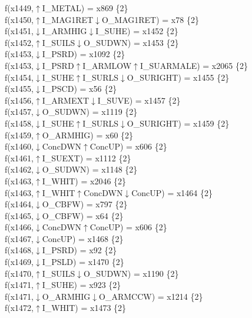f(x1449,$\uparrow$I\_METAL) = x869 \{2\} \\  
f(x1450,$\uparrow$I\_MAG1RET$\downarrow$O\_MAG1RET) = x78 \{2\} \\  
f(x1451,$\downarrow$I\_ARMHIG$\downarrow$I\_SUHE) = x1452 \{2\} \\  
f(x1452,$\uparrow$I\_SUILS$\downarrow$O\_SUDWN) = x1453 \{2\} \\  
f(x1453,$\downarrow$I\_PSRD) = x1092 \{2\} \\  
f(x1453,$\downarrow$I\_PSRD$\uparrow$I\_ARMLOW$\uparrow$I\_SUARMALE) = x2065 \{2\} \\  
f(x1454,$\downarrow$I\_SUHE$\uparrow$I\_SURLS$\downarrow$O\_SURIGHT) = x1455 \{2\} \\  
f(x1455,$\downarrow$I\_PSCD) = x56 \{2\} \\  
f(x1456,$\uparrow$I\_ARMEXT$\downarrow$I\_SUVE) = x1457 \{2\} \\  
f(x1457,$\downarrow$O\_SUDWN) = x1119 \{2\} \\  
f(x1458,$\downarrow$I\_SUHE$\uparrow$I\_SURLS$\downarrow$O\_SURIGHT) = x1459 \{2\} \\  
f(x1459,$\uparrow$O\_ARMHIG) = x60 \{2\} \\  
f(x1460,$\downarrow$ConcDWN$\uparrow$ConcUP) = x606 \{2\} \\  
f(x1461,$\uparrow$I\_SUEXT) = x1112 \{2\} \\  
f(x1462,$\downarrow$O\_SUDWN) = x1148 \{2\} \\  
f(x1463,$\uparrow$I\_WHIT) = x2046 \{2\} \\  
f(x1463,$\uparrow$I\_WHIT$\uparrow$ConcDWN$\downarrow$ConcUP) = x1464 \{2\} \\  
f(x1464,$\downarrow$O\_CBFW) = x797 \{2\} \\  
f(x1465,$\downarrow$O\_CBFW) = x64 \{2\} \\  
f(x1466,$\downarrow$ConcDWN$\uparrow$ConcUP) = x606 \{2\} \\  
f(x1467,$\downarrow$ConcUP) = x1468 \{2\} \\  
f(x1468,$\downarrow$I\_PSRD) = x92 \{2\} \\  
f(x1469,$\downarrow$I\_PSLD) = x1470 \{2\} \\  
f(x1470,$\uparrow$I\_SUILS$\downarrow$O\_SUDWN) = x1190 \{2\} \\  
f(x1471,$\uparrow$I\_SUHE) = x923 \{2\} \\  
f(x1471,$\downarrow$O\_ARMHIG$\downarrow$O\_ARMCCW) = x1214 \{2\} \\  
f(x1472,$\uparrow$I\_WHIT) = x1473 \{2\} \\  
